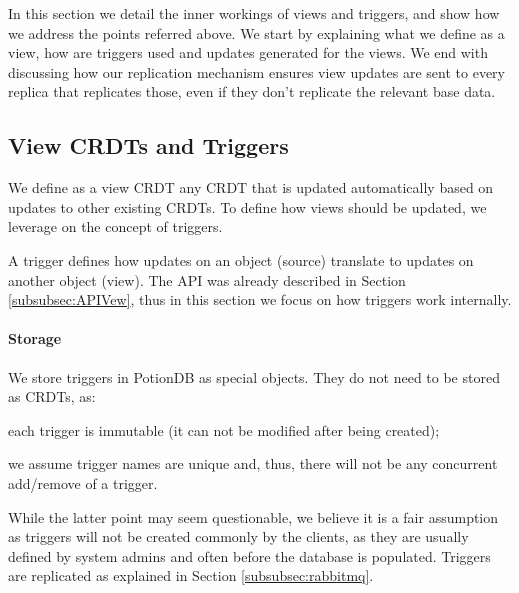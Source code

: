 \documentclass{vldb}
\newcommand{\grumbler}[2]{{\color{red}{\bf #1:} #2}}
\renewcommand{\grumbler}[2]{}
\newcommand{\andre}[1]{\grumbler{andre}{#1}}
\begin{document}
In this section we detail the inner workings of views and triggers, and show how we address the points referred above.
We start by explaining what we define as a view, how are triggers used and updates generated for the views.
We end with discussing how our replication mechanism ensures view updates are sent to every replica that replicates those, even if they don't replicate the relevant base data.

\subsection{View CRDTs and Triggers}

We define as a view CRDT any CRDT that is updated automatically based on updates to other existing CRDTs.
To define how views should be updated, we leverage on the concept of triggers.

A trigger defines how updates on an object (source) translate to updates on another object (view).
The API was already described in Section \ref{subsubsec:APIVew}, thus in this section we focus on how triggers work internally.

\paragraph{Storage}We store triggers in PotionDB as special objects.
They do not need to be stored as CRDTs, as:
\begin{enumerate*}[label=(\roman*)]
	\item each trigger is immutable (it can not be modified after being created);
	\item we assume trigger names are unique and, thus, there will not be any concurrent add/remove of a trigger.
\end{enumerate*}
While the latter point may seem questionable, we believe it is a fair assumption as triggers will not be created commonly by the clients, as they are usually defined by system admins and often before the database is populated.
Triggers are replicated as explained in Section \ref{subsubsec:rabbitmq}.

\andre{Maybe the claim above needs a citation? Suggestions?}

\andre{Note: The storage description above is how I expect to implement it in the near future. At the moment clients store the triggers, but the next step will be for the servers to store them (clients will then have to fetch them)}

\andre{I probably need a better title for the paragraph below. Suggestions?}
\end{document}
